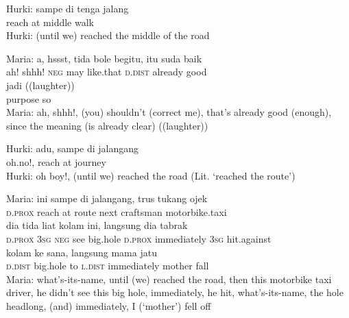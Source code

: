 \ea
\gll   Hurki:   sampe   di   tenga   jalang\\
{}  reach   at   middle   walk\\
\glt
Hurki: (until we) reached the middle of the road
\z

\ea
\gll   Maria:    {a,}    {hssst,}   tida   bole   begitu,   itu   suda   baik\\
{}  {ah!}    {shhh!}   \textsc{neg}   may   like.that   \textsc{d.dist}   already   good\\
\hspace{1cm}    {jadi}    {((laughter))}\\
   {purpose}\hspace{1cm}  {so}    {}\\
\glt
Maria: ah, shhh!, (you) shouldn’t (correct me), that’s already good (enough), since the meaning (is already clear) ((laughter))
\z

\ea
\gll   Hurki:   adu,   sampe   di   jalangang\\
{}   oh.no!,   reach   at   journey\\
\glt
Hurki: oh boy!, (until we) reached the road (Lit. ‘reached the route’)
\z

\ea
\gll   Maria:    {ini}    {sampe}    {di}    {jalangang,}    {trus}    {tukang}    {ojek}\\
{}   {\textsc{d.prox}}    {reach}    {at}    {route}    {next}    {craftsman}    {motorbike.taxi}\\
    {dia}    {tida}    {liat}    {kolam}    {ini,}    {langsung}    {dia}   tabrak\\
   {\textsc{d.prox}}    {\textsc{3sg}}    {\textsc{neg}}    {see}    {big.hole}    {\textsc{d.prox}}    {immediately}    {\textsc{3sg}}   hit.against\\
    {kolam}    {ke}    {sana,}    {langsung}    {mama}    {jatu}\\
   {\textsc{d.dist}}    {big.hole}    {to}    {\textsc{l.dist}}    {immediately}    {mother}    {fall}\\
\glt
Maria: what’s-its-name, until (we) reached the road, then this motorbike taxi driver, he didn’t see this big hole, immediately, he hit, what’s-its-name, the hole headlong, (and) immediately, I (‘mother’) fell off
\z

